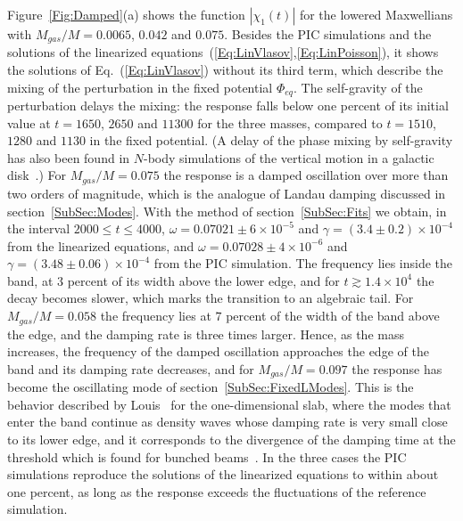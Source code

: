 Figure~\ref{Fig:Damped}(a) shows the function $|\chi_1(t)|$ for the lowered Maxwellians with $M_{gas}/M = 0.0065$, $0.042$ and $0.075$. Besides the PIC simulations and the solutions of the linearized equations~(\ref{Eq:LinVlasov},\ref{Eq:LinPoisson}), it shows the solutions of Eq.~(\ref{Eq:LinVlasov}) without its third term, which describe the mixing of the perturbation in the fixed potential $\Phi_{eq}$. The self-gravity of the perturbation delays the mixing: the response falls below one percent of its initial value at $t = 1650$, $2650$ and $11300$ for the three masses, compared to $t = 1510$, $1280$ and $1130$ in the fixed potential. (A delay of the phase mixing by self-gravity has also been found in $N$-body simulations of the vertical motion in a galactic disk~\cite{tAtA26}.) For $M_{gas}/M = 0.075$ the response is a damped oscillation over more than two orders of magnitude, which is the analogue of Landau damping discussed in section~\ref{SubSec:Modes}. With the method of section~\ref{SubSec:Fits} we obtain, in the interval $2000\leq t\leq 4000$, $\omega = 0.07021\pm 6\times 10^{-5}$ and $\gamma = (3.4\pm 0.2)\times 10^{-4}$ from the linearized equations, and $\omega = 0.07028\pm 4\times 10^{-6}$ and $\gamma = (3.48\pm 0.06)\times 10^{-4}$ from the PIC simulation. The frequency lies inside the band, at $3$ percent of its width above the lower edge, and for $t\gtrsim 1.4\times 10^4$ the decay becomes slower, which marks the transition to an algebraic tail. For $M_{gas}/M = 0.058$ the frequency lies at $7$ percent of the width of the band above the edge, and the damping rate is three times larger. Hence, as the mass increases, the frequency of the damped oscillation approaches the edge of the band and its damping rate decreases, and for $M_{gas}/M = 0.097$ the response has become the oscillating mode of section~\ref{SubSec:FixedLModes}. This is the behavior described by Louis~\cite{pL92} for the one-dimensional slab, where the modes that enter the band continue as density waves whose damping rate is very small close to its lower edge, and it corresponds to the divergence of the damping time at the threshold which is found for bunched beams~\cite{iKtAeS21}. In the three cases the PIC simulations reproduce the solutions of the linearized equations to within about one percent, as long as the response exceeds the fluctuations of the reference simulation.

